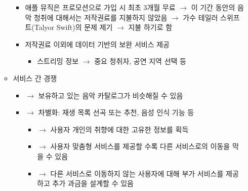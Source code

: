 \begin{itemize}
\begin{itemize}
\begin{itemize}
		\item 애플 뮤직은 프로모션으로 가입 시 최초 3개월 무료 $\rightarrow$ 이 기간 동안의 음악 청취에 대해서는 저작권료를 지불하지 않았음 $\rightarrow$ 가수 테일러 스위프트(Talyor Swift)의 문제 제기 $\rightarrow$ 지불 하기로 함 \citep{Helman:2015ur}
		\item 저작권료 이외에 데이터 기반의 보완 서비스 제공
			\begin{itemize}
			\item 스트리밍 정보 $\rightarrow$ 중요 청취자, 공연 지역 선택 등
			\end{itemize}
		\end{itemize}
	\item 서비스 간 경쟁
		\begin{itemize}
		\item $\rightarrow$ 보유하고 있는 음악 카탈로그가 비슷해질 수 있음
		\item $\rightarrow$ 차별화: 재생 목록 선곡 또는 추천, 음성 인식 기능 등
			\begin{itemize}
			\item $\rightarrow$ 사용자 개인의 취향에 대한 고유한 정보를 획득 
			\item $\rightarrow$ 사용자 맞춤형 서비스를 제공할 수록 다른 서비스로의 이동을 막을 수 있음
			\item $\rightarrow$ 다른 서비스로 이동하지 않는 사용자에 대해 부가 서비스를 제공하고 추가 과금을 설계할 수 있음
			\end{itemize}
		\end{itemize}	
	\end{itemize}
\end{itemize}


